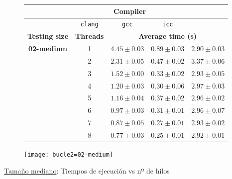 \begin{figure}[H]
    \centering
    \begin{subfigure}{0.4\textwidth}
        \begin{adjustbox}{width=\textwidth} 
        \begin{tabular}{|c|c|c|c|c|}
            \hline
            \rowcolor{azul} \multicolumn{2}{|c|}{}&\multicolumn{3}{c|}{\textbf{Compiler}} \\ \hline
            \rowcolor{azul} \multicolumn{2}{|c|}{}&\texttt{clang}&\texttt{gcc}&\texttt{icc}\\ \hline
            \rowcolor{azul} \textbf{Testing size} & \textbf{Threads}&\multicolumn{3}{c|}{\textbf{Average time (s)}} \\ \hline
            \multirow{8}{2.5cm}{\textbf{02-medium}} & 1 & \(4.45\pm{0.03}\) & \(0.89\pm{0.03}\) & \(2.90\pm{0.03}\) \\ \cline{2-5}
            & 2 & \(2.31\pm{0.05}\) & \(0.47\pm{0.02}\) & \(3.37\pm{0.06}\) \\ \cline{2-5}
            & 3 & \(1.52\pm{0.00}\) & \(0.33\pm{0.02}\) & \(2.93\pm{0.05}\) \\ \cline{2-5}
            & 4 & \(1.20\pm{0.03}\) & \(0.30\pm{0.06}\) & \(2.97\pm{0.03}\) \\ \cline{2-5}
            & 5 & \(1.16\pm{0.04}\) & \(0.37\pm{0.02}\) & \(2.96\pm{0.02}\) \\ \cline{2-5}
            & 6 & \(0.97\pm{0.03}\) & \(0.31\pm{0.01}\) & \(2.96\pm{0.07}\) \\ \cline{2-5}
            & 7 & \(0.87\pm{0.05}\) & \(0.27\pm{0.01}\) & \(2.93\pm{0.02}\) \\ \cline{2-5}
            & 8 & \(0.77\pm{0.03}\) & \(0.25\pm{0.01}\) & \(2.92\pm{0.01}\) \\ \hline
        \end{tabular}
        \end{adjustbox}
    \end{subfigure}
    \hfill
    \begin{subfigure}{0.5\textwidth}
        \texttt{[image: bucle2=02-medium]}
    \end{subfigure}
    \caption{\underline{Tamaño mediano}: Tiempos de ejecución vs nº de hilos}
    \label{bucle2=02-medium}
\end{figure}

